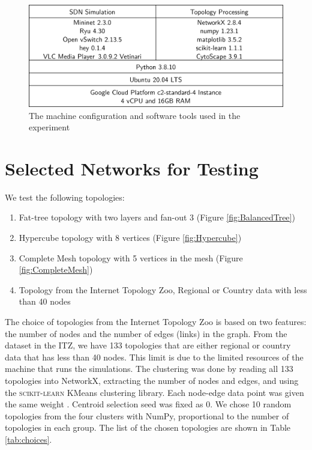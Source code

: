 \begin{figure}[htbp]
    \centering
    \includegraphics[width=\textwidth]{Figures/Test Machine Configuration.drawio.png}
    \caption{The machine configuration and software tools used in the experiment}
    \label{fig:tools}
\end{figure}

\section{Selected Networks for Testing}
We test the following topologies:
\begin{enumerate}
    \item Fat-tree topology with two layers and fan-out 3 (Figure \ref{fig:BalancedTree})
    \item Hypercube topology with 8 vertices (Figure \ref{fig:Hypercube})
    \item Complete Mesh topology with 5 vertices in the mesh (Figure \ref{fig:CompleteMesh})
    \item Topology from the Internet Topology Zoo, Regional or Country data with less than 40 nodes
\end{enumerate}

The choice of topologies from the Internet Topology Zoo is based on two features: the number of nodes and the number of edges (links) in the graph. From the dataset in the ITZ, we have 133 topologies that are either regional or country data that has less than 40 nodes. This limit is due to the limited resources of the machine that runs the simulations. The clustering was done by reading all 133 topologies into NetworkX, extracting the number of nodes and edges, and using the \textsc{scikit-learn} KMeans clustering library. Each node-edge data point was given the same weight \cite{scikit-learn}. Centroid selection seed was fixed as $0$. We chose 10 random topologies from the four clusters with NumPy, proportional to the number of topologies in each group. The list of the chosen topologies are shown in Table \ref{tab:choices}.

